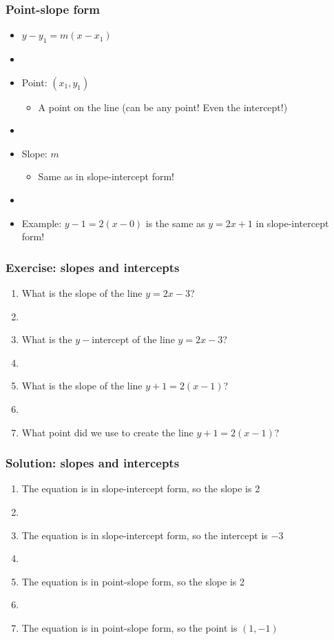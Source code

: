 \documentclass[11pt]{beamer}
\newcommand{\myframe}[1]{\begin{frame} \frametitle{#1}}
\begin{document}
\myframe{Point-slope form}
\begin{itemize}
\item $y - y_1 = m(x - x_1)$
\item[]
\item Point: $(x_1, y_1)$
\begin{itemize}
\item A point on the line (can be any point! Even the intercept!)
\end{itemize}
\item[]
\item Slope: $m$
\begin{itemize}
\item Same as in slope-intercept form!
\end{itemize}
\item[]
\item Example: $y - 1 = 2(x - 0)$ is the same as $y = 2x + 1$ in slope-intercept form!
\end{itemize}
\end{frame}

\myframe{Exercise: slopes and intercepts}
\begin{enumerate}
\item What is the slope of the line $y = 2x - 3$?
\item[]
\item What is the $y-$intercept of the line $y = 2x - 3$?
\item[]
\item What is the slope of the line $y + 1 = 2(x - 1)$?
\item[]
\item What point did we use to create the line $y + 1 = 2(x - 1)$?
\end{enumerate}
\end{frame}

\myframe{Solution: slopes and intercepts}
\begin{enumerate}
\item The equation is in slope-intercept form, so the slope is 2
\item[]
\item The equation is in slope-intercept form, so the intercept is $-3$
\item[]
\item The equation is in point-slope form, so the slope is 2
\item[]
\item The equation is in point-slope form, so the point is $(1, -1)$
\end{enumerate}
\end{frame}
\end{document}
